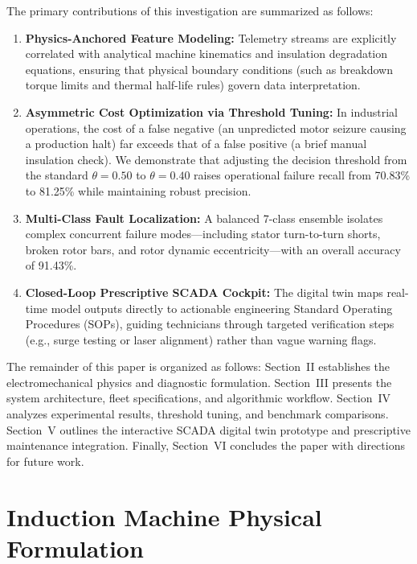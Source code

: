 \documentclass[conference]{IEEEtran}
\begin{document}
The primary contributions of this investigation are summarized as follows:
\begin{enumerate}
    \item \textbf{Physics-Anchored Feature Modeling:} Telemetry streams are explicitly correlated with analytical machine kinematics and insulation degradation equations, ensuring that physical boundary conditions (such as breakdown torque limits and thermal half-life rules) govern data interpretation.
    \item \textbf{Asymmetric Cost Optimization via Threshold Tuning:} In industrial operations, the cost of a false negative (an unpredicted motor seizure causing a production halt) far exceeds that of a false positive (a brief manual insulation check). We demonstrate that adjusting the decision threshold from the standard $\theta = 0.50$ to $\theta = 0.40$ raises operational failure recall from 70.83\% to 81.25\% while maintaining robust precision.
    \item \textbf{Multi-Class Fault Localization:} A balanced 7-class ensemble isolates complex concurrent failure modes---including stator turn-to-turn shorts, broken rotor bars, and rotor dynamic eccentricity---with an overall accuracy of 91.43\%.
    \item \textbf{Closed-Loop Prescriptive SCADA Cockpit:} The digital twin maps real-time model outputs directly to actionable engineering Standard Operating Procedures (SOPs), guiding technicians through targeted verification steps (e.g., surge testing or laser alignment) rather than vague warning flags.
\end{enumerate}

The remainder of this paper is organized as follows: Section~II establishes the electromechanical physics and diagnostic formulation. Section~III presents the system architecture, fleet specifications, and algorithmic workflow. Section~IV analyzes experimental results, threshold tuning, and benchmark comparisons. Section~V outlines the interactive SCADA digital twin prototype and prescriptive maintenance integration. Finally, Section~VI concludes the paper with directions for future work.

\section{Induction Machine Physical Formulation}
\end{document}
